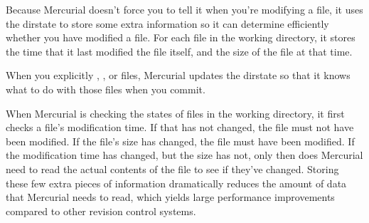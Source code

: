 Because Mercurial doesn't force you to tell it when you're modifying a
file, it uses the dirstate to store some extra information so it can
determine efficiently whether you have modified a file.  For each file
in the working directory, it stores the time that it last modified the
file itself, and the size of the file at that time.  

When you explicitly , ,  or
 files, Mercurial updates the dirstate so that it knows
what to do with those files when you commit.

When Mercurial is checking the states of files in the working
directory, it first checks a file's modification time.  If that has
not changed, the file must not have been modified.  If the file's size
has changed, the file must have been modified.  If the modification
time has changed, but the size has not, only then does Mercurial need
to read the actual contents of the file to see if they've changed.
Storing these few extra pieces of information dramatically reduces the
amount of data that Mercurial needs to read, which yields large
performance improvements compared to other revision control systems.

